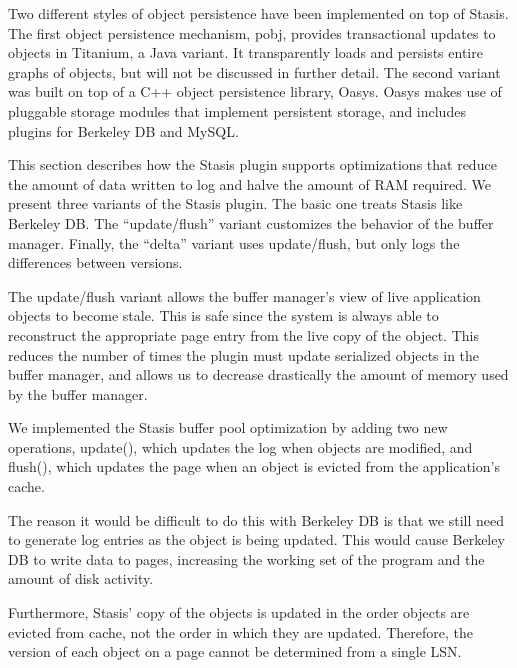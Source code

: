 \documentclass[letterpaper,twocolumn,10pt]{article}
\newcommand{\yad}{Stasis\xspace}
\newcommand{\yads}{Stasis'\xspace}
\newcommand{\oasys}{Oasys\xspace}
\begin{document}
Two different styles of object persistence have been implemented
on top of \yad.
%
The first object persistence mechanism, pobj, provides transactional updates to objects in
Titanium, a Java variant.  It transparently loads and persists
entire graphs of objects, but will not be discussed in further detail.
The second variant was built on top of a C++ object
persistence library, \oasys.  \oasys makes use of pluggable storage
modules that implement persistent storage, and includes plugins
for Berkeley DB and MySQL.  

This section describes how the \yad plugin supports optimizations that reduce the
amount of data written to log and halve the amount of RAM required.
We present three variants of the \yad plugin.  The basic one treats
\yad like Berkeley DB.  The ``update/flush'' variant
customizes the behavior of the buffer manager. Finally, the 
``delta'' variant uses update/flush, but only logs the differences
between versions.

The update/flush variant allows the buffer manager's view of live
application objects to become stale.  This is safe since the system is
always able to reconstruct the appropriate page entry from the live
copy of the object.  This reduces the number of times the
plugin must update serialized objects in the buffer manager, and
allows us to decrease drastically the amount of memory used by the
buffer manager.  

We implemented the \yad buffer pool optimization by adding two new
operations, update(), which updates the log when objects are modified, and flush(), which
updates the page when an object is evicted from the application's cache.  

The reason it would be difficult to do this with Berkeley DB is that
we still need to generate log entries as the object is being updated.
  This would cause Berkeley DB to write data to pages,
increasing the working set of the program and the amount of disk activity.

Furthermore, \yads copy of the objects is updated in the order objects
are evicted from cache, not the order in which they are updated.
Therefore, the version of each object on a page cannot be determined
from a single LSN.
\end{document}
